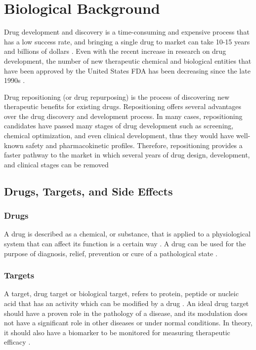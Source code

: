 \chapter{Biological Background}
\label{ch:biological}

Drug development and discovery is a time-consuming and expensive process that has a low success rate, and bringing a single drug to market can take 10-15 years and billions of dollars \cite{arrowsmith_phase_2011, arrowsmith_phase_2013}. Even with the recent increase in research on drug development, the number of new therapeutic chemical and biological entities that have been approved by the United States \ac{FDA} has been decreasing since the late 1990s \cite{wang_exploring_2014}.

Drug repositioning (or drug repurposing) is the process of discovering new therapeutic benefits for existing drugs. Repositioning offers several advantages over the drug discovery and development process. In many cases, repositioning candidates have passed many stages of drug development such as screening, chemical optimization, and even clinical development, thus they would have well-known safety and pharmacokinetic profiles. Therefore, repositioning provides a faster pathway to the market in which several years of drug design, development, and clinical stages can be removed \cite{ashburn_drug_2004}

\section{Drugs, Targets, and Side Effects}
\subsection{Drugs}
A drug is described as a chemical, or substance, that is applied to a physiological system that can affect its function is a certain way \cite{rang_rang_2014}. A drug can be used for the purpose of diagnosis, relief, prevention or cure of a pathological state \cite{satoskar_pharmacology_1973}. 

\subsection{Targets}
A target, drug target or biological target, refers to protein, peptide or nucleic acid that has an activity which can be modified by a drug \cite{gashaw_what_2011}. An ideal drug target should have a proven role in the pathology of a disease, and its modulation does not have a significant role in other diseases or under normal conditions. In theory, it should also have a biomarker to be monitored for measuring therapeutic efficacy \cite{gashaw_what_2011}.

